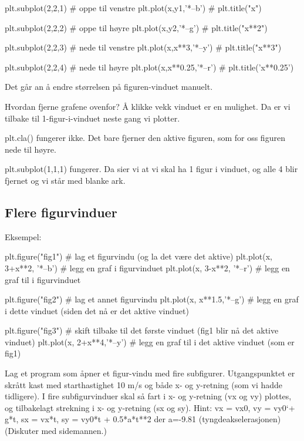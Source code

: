 \begin{usncodebox}
plt.subplot(2,2,1)          # oppe til venstre 
plt.plot(x,y1,'*--b')       # 
plt.title("x")

plt.subplot(2,2,2)          # oppe til høyre
plt.plot(x,y2,'*--g')       # 
plt.title("x**2")

plt.subplot(2,2,3)          # nede til venstre
plt.plot(x,x**3,'*--y')     # 
plt.title("x**3")

plt.subplot(2,2,4)          # nede til høyre
plt.plot(x,x**0.25,'*--r')  # 
plt.title('x**0.25')
\end{usncodebox}

Det går an å endre størrelsen på figuren-vinduet manuelt. 

Hvordan fjerne grafene ovenfor? Å klikke vekk vinduet er en mulighet. Da er vi tilbake til 1-figur-i-vinduet neste gang vi plotter. 

plt.cla()  fungerer ikke. Det bare fjerner den aktive figuren, som for oss figuren nede til høyre. 

plt.subplot(1,1,1) fungerer. Da sier vi at vi skal ha 1 figur i vinduet, og alle 4 blir fjernet 
og vi står med blanke ark. 

\subsection{Flere figurvinduer}

Eksempel:
\begin{usncodebox}
plt.figure("fig1")                     # lag et figurvindu (og la det være det aktive)
plt.plot(x, 3+x**2, '*--b')          # legg en graf i figurvinduet
plt.plot(x, 3-x**2, '*--r')          # legg en graf til i figurvinduet

plt.figure("fig2")                     # lag et annet figurvindu
plt.plot(x, x**1.5,'*--g')             # legg en graf i dette vinduet (siden det nå er det aktive vinduet)

plt.figure("fig3")                     # skift tilbake til det første vinduet (fig1 blir nå det aktive vinduet)
plt.plot(x, 2+x**4,'*--y')             # legg en graf til i det aktive vinduet (som er fig1)
\end{usncodebox}

\begin{exercise}
Lag et program som åpner et figur-vindu med fire subfigurer. Utgangspunktet er skrått kast med starthastighet 10 m/s og både x- og y-retning (som vi hadde tidligere). I fire subfigurvinduer skal så fart i x- og y-retning (vx og vy) plottes, og tilbakelagt strekning i x- og y-retning (sx og sy). Hint: vx = vx0, vy = vy0`+ g*t, sx = vx*t, sy = vy0*t + 0.5*a*t**2  der a=-9.81 (tyngdeakselerasjonen) (Diskuter med sidemannen.) 
\end{exercise}

